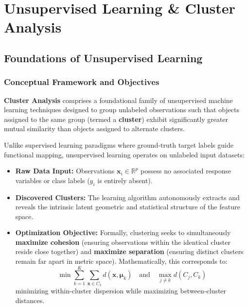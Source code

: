 \chapter{Unsupervised Learning \& Cluster Analysis}
\label{ch:unsupervised_and_clustering}

\section{Foundations of Unsupervised Learning}

\subsection{Conceptual Framework and Objectives}
\textbf{Cluster Analysis} comprises a foundational family of unsupervised machine learning techniques designed to group unlabeled observations such that objects assigned to the same group (termed a \textbf{cluster}) exhibit significantly greater mutual similarity than objects assigned to alternate clusters.

Unlike supervised learning paradigms where ground-truth target labels guide functional mapping, unsupervised learning operates on unlabeled input datasets:
\begin{itemize}
    \item \textbf{Raw Data Input:} Observations $\mathbf{x}_i \in \mathbb{R}^p$ possess no associated response variables or class labels ($y_i$ is entirely absent).
    \item \textbf{Discovered Clusters:} The learning algorithm autonomously extracts and reveals the intrinsic latent geometric and statistical structure of the feature space.
    \item \textbf{Optimization Objective:} Formally, clustering seeks to simultaneously \textbf{maximize cohesion} (ensuring observations within the identical cluster reside close together) and \textbf{maximize separation} (ensuring distinct clusters remain far apart in metric space). Mathematically, this corresponds to:
    \begin{equation}
        \min \sum_{k=1}^K \sum_{\mathbf{x} \in C_k} d(\mathbf{x}, \boldsymbol{\mu}_k) \quad \text{and} \quad \max_{j \neq k} d(C_j, C_k)
    \end{equation}
    minimizing within-cluster dispersion while maximizing between-cluster distances.
\end{itemize}

